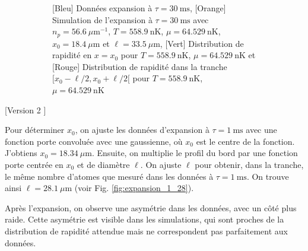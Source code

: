 \documentclass[a3, 10pt,twoside]{article}          %
\theoremstyle{plain}
\theoremstyle{definition}
\theoremstyle{remark}
\theoremstyle{definition} %
\begin{document}
\begin{figure}[H]
\begin{subfigure}[b]{0.45\textwidth}
        \caption{{\color{blue}[Bleu] Données expansion à $\tau = 30~\text{ms}$}, {\color{orange}[Orange] Simulation de l'expansion à $\tau = 30~\text{ms}$ avec $n_p = 56.6~\mu \text{m}^{-1}$, $T = 558.9~\text{nK}$, $\mu = 64.529~\text{nK}$, $x_0 = 18.4~\mu \text{m}$ et $\ell = 33.5~\mu \text{m}$}, {\color{OliveGreen}[Vert] Distribution de rapidité en $x = x_0$ pour $T = 558.9~\text{nK}$, $\mu = 64.529~\text{nK}$} et {\color{red}[Rouge] Distribution de rapidité dans la tranche $[x_0 - \ell/2, x_0 + \ell/2[$ pour $T = 558.9~\text{nK}$, $\mu = 64.529~\text{nK}$}}
        \label{fig:expansion_30_33}
    \end{subfigure}
    \caption{}
    \label{}
\end{figure}

[Version 2 ] 

	Pour déterminer $x_0$, on ajuste les données d'expansion à $\tau = 1~\text{ms}$ avec une fonction porte convoluée avec une gaussienne, où $x_0$ est le centre de la fonction. J'obtiens $x_0 = 18.34~\mu \text{m}$. Ensuite, on multiplie le profil du bord par une fonction porte centrée en $x_0$ et de diamètre $\ell$. On ajuste $\ell$ pour obtenir, dans la tranche, le même nombre d'atomes que mesuré dans les données à $\tau = 1~\text{ms}$. On trouve ainsi $\ell = 28.1~\mu \text{m}$ (voir Fig. \ref{fig:expansion_1_28}). 

Après l'expansion, on observe une asymétrie dans les données, avec un côté plus raide. Cette asymétrie est visible dans les simulations, qui sont proches de la distribution de rapidité attendue mais ne correspondent pas parfaitement aux données.
\end{document}
